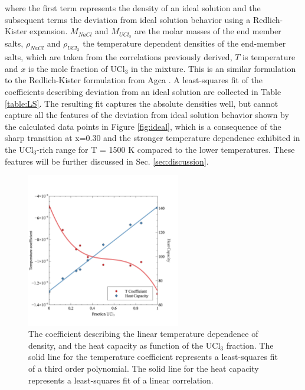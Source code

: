 \documentclass[preprint,3p,10pt,onecolumn,number,sort&compress]{elsarticle}
\begin{document}
{where the first term represents the density of an ideal solution and the subsequent terms the deviation from ideal solution behavior using a Redlich-Kister expansion. $M_{NaCl}$ and $M_{UCl_3}$ are the molar masses of the end member salts, $\rho_{NaCl}$ and $\rho_{UCl_3}$ the temperature dependent densities of the end-member salts, which are taken from the correlations previously derived, $T$ is temperature and $x$ is the mole fraction of UCl$_3$ in the mixture. This is an similar formulation to the Redlich-Kister formulation from Agca \cite{agca2022}. A least-squares fit of the coefficients describing deviation from an ideal solution are collected in Table \ref{table:LS}. 
 The resulting fit captures the absolute densities well, but cannot capture all the features of the deviation from ideal solution behavior shown by the calculated data points in Figure \ref{fig:ideal}, which is a consequence of the sharp transition at x=0.30 and the stronger temperature dependence exhibited in the UCl$_3$-rich range for T = 1500 K compared to the lower temperatures. These features will be further discussed in Sec. \ref{sec:discussion}.

\begin{figure}[htb]
\centering
\includegraphics[width=0.6\textwidth]{fig9.jpg}
\caption{The coefficient describing the linear temperature dependence of density, and the heat capacity as function of the UCl$_3$ fraction. The solid line for the temperature coefficient represents a least-squares fit of a third order polynomial. The solid line for the heat capacity represents a least-squares fit of a linear correlation.}
\label{fig:TandCp}
\end{figure}

}
\end{document}

